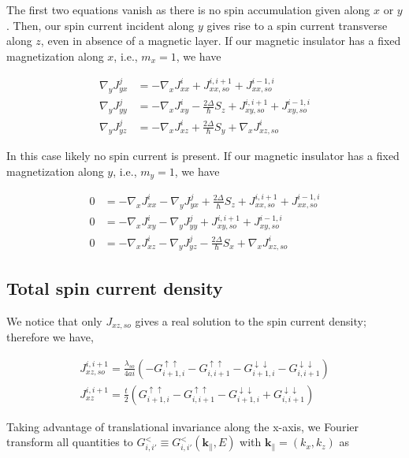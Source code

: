 \documentclass[10pt,prb,showpacs,amssymb,floatfix]{revtex4-1}
\newcommand{\dna}{\downarrow}
\newcommand{\nn}{\nonumber}
\newcommand{\para}{\parallel}
\newcommand{\upa}{\uparrow}
\newcommand{\Dlt}{\Delta}
\begin{document}
The first two equations vanish as there is no spin accumulation given along $x$ or $y$. Then, our spin current incident along $y$ gives rise to a spin current transverse along $z$, even in absence of a magnetic layer. If our magnetic insulator has a fixed magnetization along $x$, i.e., $m_x=1$, we have

\begin{align}
\nabla_y J^{j}_{yx}  &= -\nabla_x J^{i}_{xx}       + J_{xx,so}^{i,i+1} + J_{xx,so}^{i-1,i} \\
\nabla_y J^{j}_{yy} &= -\nabla_x J^{i}_{xy}      -\frac{2\Dlt}{\hbar} S_z  + J_{xy,so}^{i,i+1} + J_{xy,so}^{i-1,i}  \\
\nabla_y J^{j}_{yz}  &= -\nabla_x J^{i}_{xz}    +\frac{2\Dlt}{\hbar}    S_y + \nabla_x J_{xz,so}^i 
\end{align}

In this case likely no spin current is present. If our magnetic insulator has a fixed magnetization along $y$, i.e., $m_y=1$, we have

\begin{align}
0 &= -\nabla_x J^{i}_{xx}  - \nabla_y J^{j}_{yx}    +\frac{2\Dlt}{\hbar} S_z  + J_{xx,so}^{i,i+1} + J_{xx,so}^{i-1,i} \\
0 &= -\nabla_x J^{i}_{xy}  -\nabla_y J^{j}_{yy}    + J_{xy,so}^{i,i+1} + J_{xy,so}^{i-1,i}  \\
0 &= -\nabla_x J^{i}_{xz}  -\nabla_y J^{j}_{yz}   -\frac{2\Dlt}{\hbar} S_x  + \nabla_x J_{xz,so}^i 
\end{align}

\subsection{Total spin current density}

We notice that only $J_{xz,so}$ gives a real solution to the spin current density; therefore we have,

\begin{align}
J_{xz,so}^{i,i+1} = \frac{\lambda_{so}}{4ai} (-G_{i+1,i}^{\upa\upa}   - G_{i,i+1}^{\upa\upa}  -   G_{i+1,i}^{\dna\dna}   -  G_{i,i+1}^{\dna\dna}) \nn\\
J_{xz}^{i,i+1} = \frac{t}{2}(G_{i+1,i}^{\upa\upa}   - G_{i,i+1}^{\upa\upa}  -   G_{i+1,i}^{\dna\dna}   +  G_{i,i+1}^{\dna\dna})
\end{align}

Taking advantage of translational invariance along the x-axis, we Fourier transform all quantities to $G^<_{i,i'} \equiv G^<_{i,i'}(\bm k_\para, E)$ with $\bm k_\para = (k_x, k_z)$ as
\end{document}
